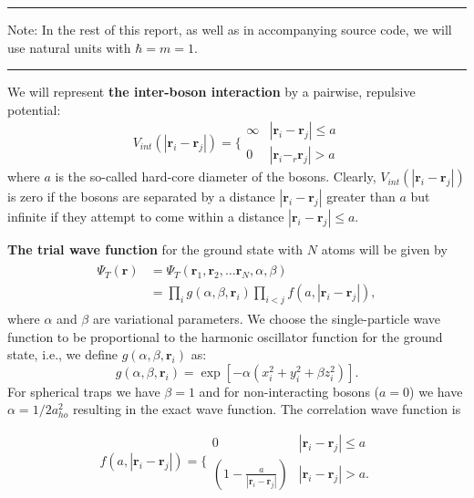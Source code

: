 \documentclass[twocolumn]{article}
\begin{document}
\vspace{0.3cm}\hrule\vspace{0.2cm}
Note: In the rest of this report, as well as in accompanying source code, we
will use natural units with $\hbar = m = 1$.
\vspace{0.2cm}\hrule\vspace{0.3cm}

We will represent \textbf{the inter-boson interaction} by a pairwise,
repulsive potential:
\begin{equation}
    V_{int}(|\mathbf{r}_i-\mathbf{r}_j|) =  \Bigg\{
        \begin{array}{ll}
            \infty & {|\mathbf{r}_i-\mathbf{r}_j|} \leq {a}\\
            0 & {|\mathbf{r}_i-_r\mathbf{r}_j|} > {a}
        \end{array}
\end{equation}
where $a$ is the so-called hard-core diameter of the bosons.
Clearly, $V_{int}(|\mathbf{r}_i-\mathbf{r}_j|)$ is zero if the bosons are
separated by a distance $|\mathbf{r}_i-\mathbf{r}_j|$ greater than $a$ but
infinite if they attempt to come within a distance $|\mathbf{r}_i-\mathbf{r}_j| \leq a$.

\textbf{The trial wave function} for the ground state with $N$ atoms will be given by
\begin{align}
    \begin{split}
    \Psi_T(\mathbf{r})&=\Psi_T(\mathbf{r}_1, \mathbf{r}_2, \dots
    \mathbf{r}_N,\alpha,\beta)\\
    &=\prod_i g(\alpha,\beta,\mathbf{r}_i)\prod_{i<j}f(a,|\mathbf{r}_i-\mathbf{r}_j|),
    \end{split}
    \label{eq:trialwf}
\end{align}
where $\alpha$ and $\beta$ are variational parameters. We choose the
single-particle wave function to be proportional to the harmonic
oscillator function for the ground state, i.e., we define $g(\alpha,\beta,\mathbf{r}_i)$ as:
\begin{equation}
    g(\alpha,\beta,\mathbf{r}_i)= \exp[-\alpha(x_i^2+y_i^2+\beta z_i^2)].
\end{equation}
For spherical traps we have $\beta = 1$ and for non-interacting
bosons ($a=0$) we have $\alpha = 1/2a_{ho}^2$ resulting in the exact wave
function. The correlation wave function is

\begin{equation}
    f(a,|\mathbf{r}_i-\mathbf{r}_j|)=\Bigg\{
        \begin{array}{ll}
            0 & {|\mathbf{r}_i-\mathbf{r}_j|} \leq {a}\\
            (1-\frac{a}{|\mathbf{r}_i-\mathbf{r}_j|}) & {|\mathbf{r}_i-\mathbf{r}_j|} > {a}.
        \end{array}
\end{equation}
\end{document}
